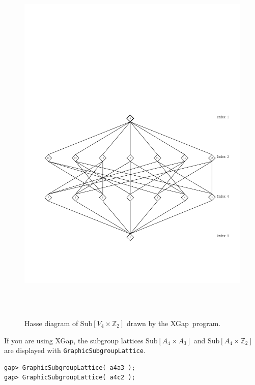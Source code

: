 \documentclass[11pt]{amsart}
\newcommand{\xgap}{XGap}   %
\theoremstyle{plain}
\newcommand{\codesize}{\footnotesize}
\newcommand{\<}{\ensuremath{\langle}}
\renewcommand{\>}{\ensuremath{\rangle}}
\newcommand{\Sub}{\ensuremath{\mathrm{Sub}}}
\newcommand{\Z}{\ensuremath{\mathbb{Z}}}
\begin{document}
\begin{enumerate}
\begin{figure}[h!]
\begin{center}
\includegraphics[height=18cm]{v4c2new.pdf}%
\caption{Hasse diagram of $\Sub[V_4 \times \Z_2]$ drawn by the \xgap\ program.}
\label{fig:v4c2}
\end{center}\end{figure}
\noindent If you are using \xgap, the subgroup lattices 
$\Sub[A_4 \times A_3]$ and $\Sub[A_4 \times \Z_2]$ are displayed with
{\tt GraphicSubgroupLattice}.  
{\codesize
\begin{verbatim}
gap> GraphicSubgroupLattice( a4a3 );
gap> GraphicSubgroupLattice( a4c2 );

\end{verbatim}}


\end{enumerate}
\end{document}

